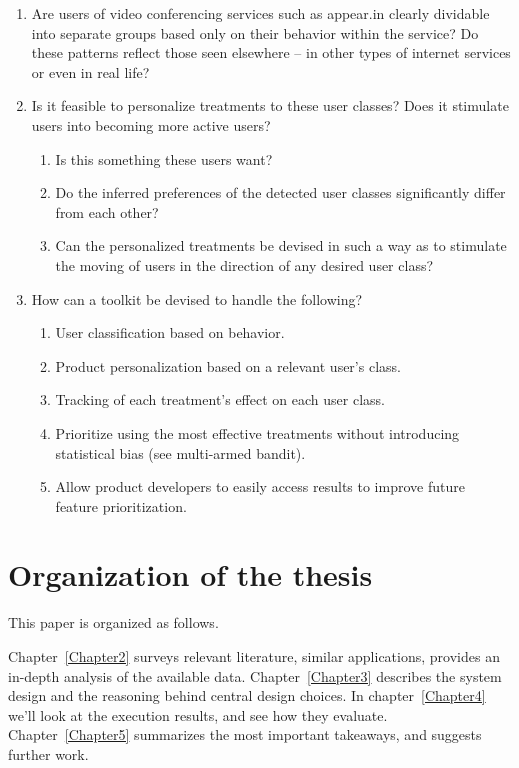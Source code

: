 \begin{enumerate}
  \item Are users of video conferencing services such as appear.in clearly dividable into separate groups based only on their behavior within the service? Do these patterns reflect those seen elsewhere -- in other types of internet services or even in real life?
  \item Is it feasible to personalize treatments to these user classes? Does it stimulate users into becoming more active users?
  \begin{enumerate}
    \item Is this something these users want?
    \item Do the inferred preferences of the detected user classes significantly differ from each other?
    \item Can the personalized treatments be devised in such a way as to stimulate the moving of users in the direction of any desired user class?
  \end{enumerate}
  \item How can a toolkit be devised to handle the following?
  \begin{enumerate}
    \item User classification based on behavior.
    \item Product personalization based on a relevant user's class.
    \item Tracking of each treatment's effect on each user class.
    \item Prioritize using the most effective treatments without introducing statistical bias (see multi-armed bandit).
    \item Allow product developers to easily access results to improve future feature prioritization.
  \end{enumerate}
\end{enumerate}

\section{Organization of the thesis}
\label{sec:thesis_organization}

This paper is organized as follows.

Chapter~\ref{Chapter2} surveys relevant literature, similar applications, provides an in-depth analysis of the available data.
Chapter~\ref{Chapter3} describes the system design and the reasoning behind central design choices.
In chapter~\ref{Chapter4} we'll look at the execution results, and see how they evaluate.
Chapter~\ref{Chapter5} summarizes the most important takeaways, and suggests further work.


